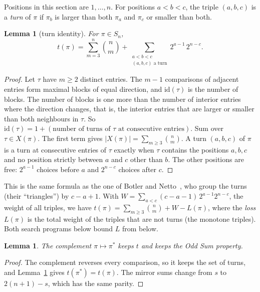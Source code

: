 \documentclass[11pt]{article}
\newtheorem{lemma}[theorem]{Lemma}
\theoremstyle{remark}
\begin{document}
Positions in this section are $1, \dots, n$. For positions $a < b < c$, the triple $(a, b, c)$ is a \emph{turn} of $\pi$ if $\pi_b$ is larger than both $\pi_a$ and $\pi_c$ or smaller than both.

\begin{lemma}[turn identity]\label{lem:turn}
For $\pi \in S_n$,
\[
  t(\pi) = \sum_{m=3}^{n} \binom{n}{m} + \sum_{\substack{a<b<c\\ (a,b,c) \text{ a turn}}} 2^{a-1}\, 2^{n-c}.
\]
\end{lemma}

\begin{proof}
Let $\tau$ have $m \ge 2$ distinct entries. The $m-1$ comparisons of adjacent entries form maximal blocks of equal direction, and $\mathrm{id}(\tau)$ is the number of blocks. The number of blocks is one more than the number of interior entries where the direction changes, that is, the interior entries that are larger or smaller than both neighbours in $\tau$. So $\mathrm{id}(\tau) = 1 + (\text{number of turns of } \tau \text{ at consecutive entries})$. Sum over $\tau \in X(\pi)$. The first term gives $|X(\pi)| = \sum_{m \ge 3} \binom{n}{m}$. A turn $(a, b, c)$ of $\pi$ is a turn at consecutive entries of $\tau$ exactly when $\tau$ contains the positions $a, b, c$ and no position strictly between $a$ and $c$ other than $b$. The other positions are free: $2^{a-1}$ choices before $a$ and $2^{n-c}$ choices after $c$.
\end{proof}

This is the same formula as the one of Botler and Netto~\cite[Section 2]{BN}, who group the turns (their ``triangles'') by $c - a + 1$. With $W = \sum_{a < c} (c - a - 1)\, 2^{a-1} 2^{n-c}$, the weight of all triples, we have $t(\pi) = \sum_{m \ge 3}\binom{n}{m} + W - L(\pi)$, where the \emph{loss} $L(\pi)$ is the total weight of the triples that are not turns (the monotone triples). Both search programs below bound $L$ from below.

\begin{lemma}\label{lem:sym}
The complement $\pi \mapsto \pi^*$ keeps $t$ and keeps the Odd Sum property.
\end{lemma}

\begin{proof}
The complement reverses every comparison, so it keeps the set of turns, and Lemma~\ref{lem:turn} gives $t(\pi^*) = t(\pi)$. The mirror sums change from $s$ to $2(n+1) - s$, which has the same parity.
\end{proof}
\end{document}
